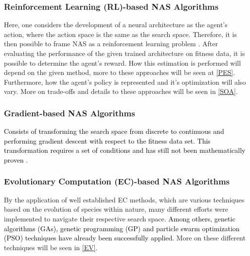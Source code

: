 \documentclass[10pt,        %
               a4paper,     %
               journal,     %
               ]{IEEEtran}
\begin{document}
\subsubsection{\textbf{Reinforcement Learning} (RL)-based NAS Algorithms}
Here, one considers the development of a neural architecture as the agent's action, where the action space is the same as
the search space. Therefore, it is then possible to frame NAS as a reinforcement learning problem \cite{elsken2019neural}.
After evaluating the performance of the given trained architecture on fitness data, it is possible to
determine the agent's reward. How this estimation is performed will depend on the given method, more to these
approaches will be seen at \ref{PES}. Furthermore, how the agent's policy is represented and it's optimization will
also vary. More on trade-offs and details to these approaches will be seen in \ref{SOA}.

\subsubsection{\textbf{Gradient}-based NAS Algorithms}
\textcolor{black}{
Consists of transforming the search space from discrete to continuous and performing
gradient descent with respect to the fitness data set. This transformation requires a set of conditions
and has still not been mathematically proven \cite{liu2021survey}.
}

\subsubsection{\textbf{Evolutionary Computation} (EC)-based NAS Algorithms}
By the application of well established EC methods, which are various techniques based on the evolution of
species within nature, many different efforts were implemented to navigate their respective search space.
\textcolor{black}{
Among others, genetic algorithms (GAs), genetic programming (GP) and particle swarm optimization (PSO)
techniques have already been successfully applied.
}
More on these different techniques will be seen in \ref{EV}.
\end{document}
